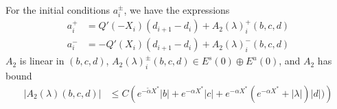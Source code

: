 \documentclass[thesis.tex]{subfiles}
\begin{document}
\begin{lemma}\label{lemma:aipm}
For the initial conditions $a_i^\pm$, we have the expressions
\begin{equation}\label{aipmexp1}
\begin{aligned}
a_i^+ &= Q'(-X_i) (d_{i+1} - d_i ) + A_2(\lambda)_i^+(b, c, d)\\
a_i^- &= -Q'(X_i) (d_{i+1} - d_i ) + A_2(\lambda)_i^-(b, c, d)
\end{aligned}
\end{equation}
$A_2$ is linear in $(b, c, d)$, $A_2(\lambda)_i^\pm(b, c, d) \in E^s(0) \oplus E^u(0)$, and $A_2$ has bound
\begin{align}
|A_2(\lambda)(b, c, d)|
&\leq C \left(e^{-\tilde{\alpha} X^*}|b| + e^{-\alpha X^*}|c| + e^{-\alpha X^*}(e^{-\alpha X^*} + |\lambda|)|d| ) \right) \label{A2bound}
\end{align}


\end{lemma}
\end{document}
